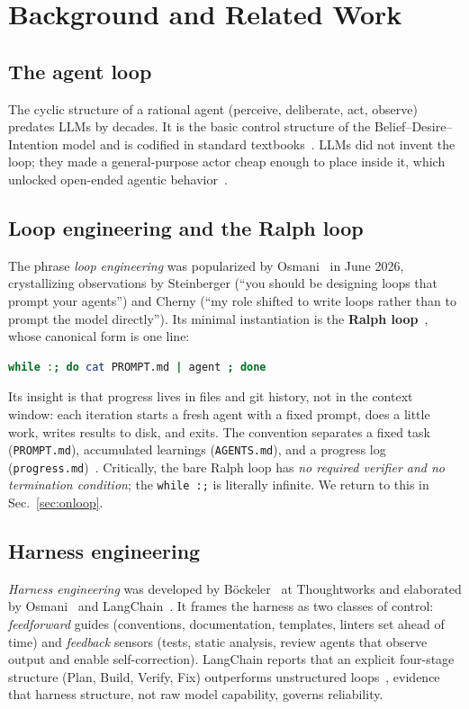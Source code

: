 \documentclass[10pt,twocolumn,letterpaper]{article}
\begin{document}
\section{Background and Related Work}

\subsection{The agent loop}
The cyclic structure of a rational agent (perceive, deliberate, act, observe)
predates LLMs by decades. It is the basic control structure of the
Belief--Desire--Intention model and is codified in standard
textbooks~\cite{russellnorvig}. LLMs did not invent the loop; they made a
general-purpose actor cheap enough to place inside it, which unlocked open-ended
agentic behavior~\cite{oracle}.

\subsection{Loop engineering and the Ralph loop}
The phrase \emph{loop engineering} was popularized by Osmani~\cite{osmaniloop}
in June 2026, crystallizing observations by Steinberger (``you should be
designing loops that prompt your agents'') and Cherny (``my role shifted to
write loops rather than to prompt the model directly''). Its minimal
instantiation is the \textbf{Ralph loop}~\cite{ralph}, whose canonical form is
one line:
\begin{lstlisting}[language=bash]
while :; do cat PROMPT.md | agent ; done
\end{lstlisting}
Its insight is that progress lives in files and git history, not in the context
window: each iteration starts a fresh agent with a fixed prompt, does a little
work, writes results to disk, and exits. The convention separates a fixed task
(\texttt{PROMPT.md}), accumulated learnings (\texttt{AGENTS.md}), and a progress
log (\texttt{progress.md})~\cite{ralph,bharath}. Critically, the bare Ralph loop
has \emph{no required verifier and no termination condition}; the
\texttt{while :;} is literally infinite. We return to this in
Sec.~\ref{sec:onloop}.

\subsection{Harness engineering}
\emph{Harness engineering} was developed by B\"ockeler~\cite{bockeler} at
Thoughtworks and elaborated by Osmani~\cite{osmaniharness} and
LangChain~\cite{langchain}. It frames the harness as two classes of control:
\emph{feedforward} guides (conventions, documentation, templates, linters set
ahead of time) and \emph{feedback} sensors (tests, static analysis, review
agents that observe output and enable self-correction). LangChain reports that
an explicit four-stage structure (Plan, Build, Verify, Fix) outperforms
unstructured loops~\cite{langchain}, evidence that harness structure, not raw
model capability, governs reliability.
\end{document}
